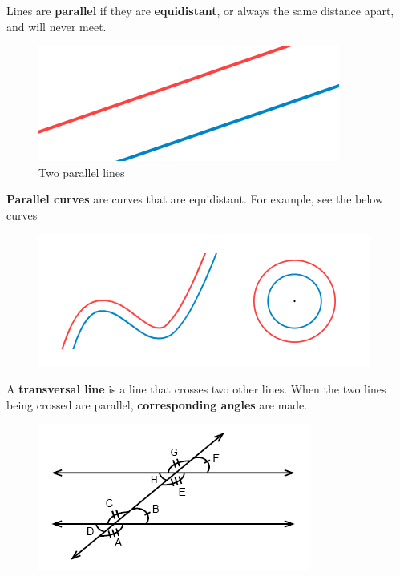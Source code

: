         \noindent Lines are \textbf{parallel} if they are \textbf{equidistant}, or always the
        same distance apart, and will never meet. \\

        \begin{figure} [hbt!]
            \centering
            \includegraphics[scale = 0.4] {Resources/Unit1Basics/parallel.PNG}
            \caption*{Two parallel lines}
        \end{figure}

        \noindent \textbf{Parallel curves} are curves that are equidistant. For example, see the
        below curves \\

        \begin{figure} [hbt!]
            \centering
            \includegraphics[scale = 0.4] {Resources/Unit1Basics/parallel_curves.PNG}
        \end{figure}

        \noindent A \textbf{transversal line} is a line that crosses two other lines. When the
        two lines being crossed are parallel, \textbf{corresponding angles} are made.

        \begin{figure} [hbt!]
            \centering
            \includegraphics[scale = 0.6] {Resources/Unit1Basics/corresponding.PNG}
        \end{figure}

